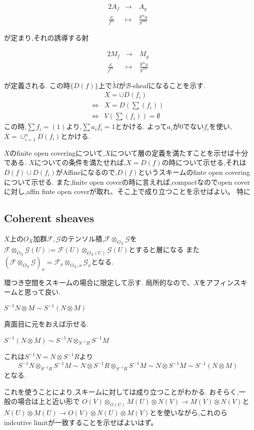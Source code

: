 \begin{alignat*}{2}
 A_f & \to &  \ A_g \\
 \frac{a}{f^m} & \mapsto & \ \frac{b^ma}{g^{mn}}
\end{alignat*}

が定まり,それの誘導する射

\begin{alignat*}{2}
 M_f & \to &  \ M_g \\
 \frac{x}{f^m} & \mapsto & \ \frac{b^m x}{g^{mn}}
\end{alignat*}

が定義される.
この時$\{D(f)\}$上で$\tilde{M}$が$\mathcal{B}$-sheafになることを示す.
\begin{align*}
  & X = \cup D(f_i) \\
\Leftrightarrow & X = D \left(\sum (f_i) \right) \\
\Leftrightarrow & V \left(\sum (f_i) \right) = \emptyset
\end{align*}
この時,$\sum f_i = (1)$より,$\sum a_i f_i = 1$とかける.
よって$a_i$が$0$でない$f_i$を使い,$X = \cup_{i=1}^n D(f_i)$とかける.

$X$のfinite open coveringについて,$X$について層の定義を満たすことを示せば十分である.
$X$についての条件を満たせれば,$X=D(f)$の時について示せる,それは$D(f) \cup D(f_i)$がAffineになるので,$D(f)$というスキームのfinte open coveringについて示せる.
また,finite open coverの時に言えれば,compactなのでopen coverに対し,affin finte open coverが取れ、そこ上で成り立つことを示せばよい。
特に
\subsection{Coherent sheaves}


\begin{lem}
\label{tensor module}
$X$上の$O_X$加群$\mathcal{F},\mathcal{G}$のテンソル積,$\mathcal{F} \otimes_{O_X} \mathcal{G}$を
$\mathcal{F} \otimes_{O_X} \mathcal{G}(U) := \mathcal{F}(U) \otimes_{O_X(U)} \mathcal{G}(U)$とすると層になる
また$(\mathcal{F} \otimes_{O_X} \mathcal{G})_x = \mathcal{F}_x \otimes_{O_X, x} \mathcal{G}_x$となる.
\end{lem}
環つき空間をスキームの場合に限定して示す. 局所的なので、$X$をアフィンスキームと思って良い.

\begin{lem}
$S^{-1}N \otimes M \sim S^{-1}(N \otimes M)$
\end{lem}
真面目に元をおえば示せる.


\begin{lem}
$S^{-1}(N \otimes M) \sim S^{-1}N \otimes_{S^{-1}R} S^{-1}M$
\end{lem}
これは$S^{-1}N = N \otimes S^{-1}R$より
\begin{equation*}
  S^{-1}N \otimes_{S^{-1}R} S^{-1}M \sim N \otimes S^{-1}R \otimes_{S^{-1}R} S^{-1}M \sim N \otimes S^{-1}M \sim  S^{-1}(N \otimes M)
\end{equation*}
となる.

これを使うことにより,スキームに対しては成り立つことがわかる.
おそらく,一般の場合は上と近い形で
$O(V) \otimes_{O(U)} M(U) \otimes N(V) \to M(V) \otimes N(V)$と
$N(U) \otimes M(U) \to O(V) \otimes N(U) \otimes M(V)$とを使いながら,これのらindcutive limitが一致することを示せばよいはず。
